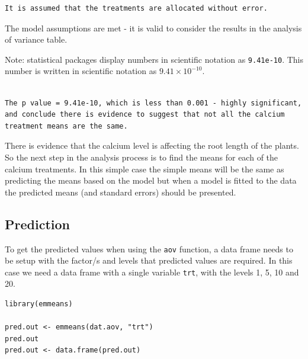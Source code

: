 \documentclass[a4paper, 10pt, fleqn, twosided]{memoir}
\begin{document}
\begin{tcolorbox}[title = Example 1 Assumption 5]
\begin{verbatim}
It is assumed that the treatments are allocated without error.
\end{verbatim}
\end{tcolorbox}

The model assumptions are met - it is valid to consider the results in the analysis of variance table.


Note: statistical packages display numbers in scientific notation as \texttt{9.41e-10}. This number is written in
scientific notation as $9.41\times 10^{-10}$.

\begin{tcolorbox}[title = Example 1 ANOVA interpretation]
\begin{verbatim}

The p value = 9.41e-10, which is less than 0.001 - highly significant,
and conclude there is evidence to suggest that not all the calcium
treatment means are the same.

\end{verbatim}
\end{tcolorbox}

There is evidence that the calcium level is affecting the root length of the plants. So the next step in the analysis
process is to find the means for each of the calcium treatments. In this simple case the simple means will be the same
as predicting the means based on the model but when a model is fitted to the data the predicted means (and standard
errors) should be presented.


\subsection{Prediction}

To get the predicted values when using the \texttt{aov} function, a data frame needs to be setup with the factor/s and
levels that predicted values are required. In this case we need a data frame with a single variable \texttt{trt}, with
the levels 1, 5, 10 and 20.

\begin{tcolorbox}[title = Example 1 predicted values]
\begin{verbatim}
library(emmeans)

pred.out <- emmeans(dat.aov, "trt")
pred.out
pred.out <- data.frame(pred.out)
\end{verbatim}
\end{tcolorbox}
\end{document}
